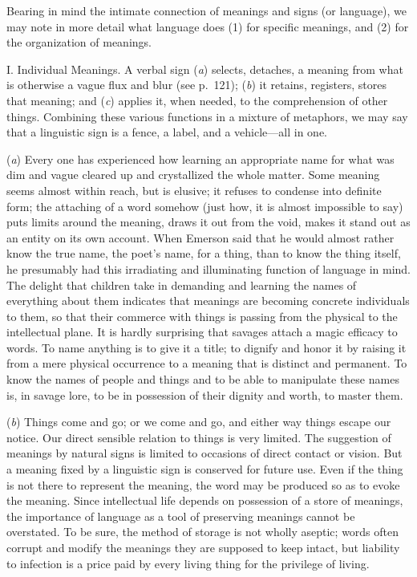 \documentclass[letterpaper]{book}
\begin{document}
Bearing in mind the intimate connection of meanings and signs (or
language), we may note in more detail what language does (1) for
specific meanings, and (2) for the organization of meanings.

I. Individual Meanings. A verbal sign (\emph{a}) selects, detaches, a
meaning from what is otherwise a vague flux and blur (see p.\ 121);
(\emph{b}) it retains, registers, stores that meaning; and (\emph{c})
applies it, when needed, to the comprehension of other things. Combining
these various functions in a mixture of metaphors, we may say that a
linguistic sign is a fence, a label, and a vehicle---all in one.


(\emph{a}) Every one has experienced how learning an appropriate name
for what was dim and vague cleared up and crystallized the whole matter.
Some meaning seems almost within reach, but is elusive; it refuses to
condense into definite form; the attaching of a word somehow (just how,
it is almost impossible to say) puts limits around the meaning, draws it
out from the void, makes it stand out as an entity on its own account.
When Emerson said that he would almost rather know the true name, the
poet's name, for a thing, than to know the thing itself, he presumably
had this irradiating and illuminating function of language in mind. The
delight that children take in demanding and learning the names of
everything about them indicates that meanings are becoming concrete
individuals to them, so that their commerce with things is passing from
the physical to the intellectual plane. It is hardly surprising that
savages attach a magic efficacy to words. To name anything is to give it
a title; to dignify and honor it
by
raising it from a mere physical occurrence to a meaning that is distinct
and permanent. To know the names of people and things and to be able to
manipulate these names is, in savage lore, to be in possession of their
dignity and worth, to master them.


(\emph{b}) Things come and go; or we come and go, and either way things
escape our notice. Our direct sensible relation to things is very
limited. The suggestion of meanings by natural signs is limited to
occasions of direct contact or vision. But a meaning fixed by a
linguistic sign is conserved for future use. Even if the thing is not
there to represent the meaning, the word may be produced so as to evoke
the meaning. Since intellectual life depends on possession of a store of
meanings, the importance of language as a tool of preserving meanings
cannot be overstated. To be sure, the method of storage is not wholly
aseptic; words often corrupt and modify the meanings they are supposed
to keep intact, but liability to infection is a price paid by every
living thing for the privilege of living.
\end{document}

